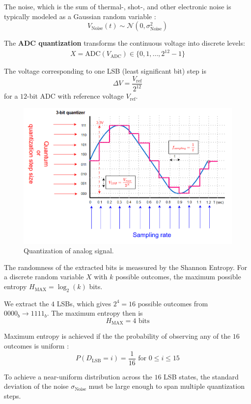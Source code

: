 The noise, which is the sum of thermal-, shot-, and other electronic 
noise is typically modeled as a Gaussian random variable 
\cite{Gundersen2019}:
\[ 
    V_{\text{Noise}}(t) \sim \mathcal N(0, \sigma^2_{\text{Noise}}) 
\]

The \textbf{ADC quantization} transforms the continuous voltage 
into discrete levels: 
\begin{align*}
    X = \text{ADC}(V_{\text{ADC}}) \in \{0,1,\dots,2^{12}-1\}
\end{align*}

The voltage corresponding to one LSB (least significant bit) step 
is 
\[ 
    \Delta V = \frac{V_{\text{ref}}}{2^{12}}
\]
for a \(12\)-bit ADC with reference voltage \(V_{\text{ref}}\).


\begin{figure}[h]
    \centering
    \includegraphics[width=0.8\linewidth]{./images/quantization.png} 
    \caption{Quantization of analog signal.}
    \label{fig:quantization} 
\end{figure}

The randomness of the extracted bits is meassured by the 
Shannon Entropy. For a discrete random variable \(X\) with 
\(k\) possible outcomes, the maximum possible entropy 
\(H_{\text{MAX}} = \log_2(k)\) bits. 

We extract the \(4\) LSBs, which gives \(2^4 = 16\) possible 
outcomes from \(0000_b \to 1111_b\). The maximum entropy then is 
\[ 
    H_{\text{MAX}} = 4 \text{ bits}
\]

Maximum entropy is achieved if the the probability of 
observing any of the \(16\) outcomes is uniform
\cite{Gray1990,StatisticShowTo}:
\[ 
    P(D_{\text{LSB}} = i) = \frac{1}{16} \text{ for } 0 \leq i \leq 15
\]

To achieve a near-uniform distribution across the \(16\) LSB 
states, the standard deviation of the noise \(\sigma_{\text{Noise}}\)
must be large enough to span multiple quantization steps.

